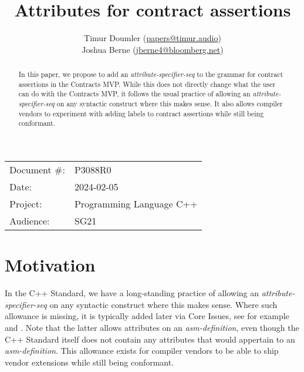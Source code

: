 

 \usepackage[bottom]{footmisc} 


\title{Attributes for contract assertions}
\author{ Timur Doumler \small(\href{mailto:papers@timur.audio}{papers@timur.audio})  \\
Joshua Berne \small(\href{mailto:jberne4@bloomberg.net}{jberne4@bloomberg.net})
}
\date{}
\maketitle

\begin{tabular}{ll}
Document \#: & P3088R0 \\
Date: &2024-02-05 \\
Project: & Programming Language C++ \\
Audience: & SG21
\end{tabular}

\begin{abstract}
In this paper, we propose to add an \emph{attribute-specifier-seq} to the grammar for contract assertions in the Contracts MVP. While this does not directly change what the user can do with the Contracts MVP, it follows the usual practice of allowing an \emph{attribute-specifier-seq} on any syntactic construct where this makes sense. It also allows compiler vendors to experiment with adding labels to contract assertions while still being conformant. 
\end{abstract}

\section{Motivation}
\label{sec:intro}

In the C++ Standard, we have a long-standing practice of allowing an \emph{attribute-specifier-seq} on any syntactic construct where this makes sense. Where such allowance is missing, it is typically added later via Core Issues, see for example \cite{CWG1657} and \cite{CWG2262}. Note that the latter allows attributes on an \emph{asm-definition}, even though the C++ Standard itself does not contain any attributes that would appertain to an \emph{asm-definition}. This allowance exists for compiler vendors to be able to ship vendor extensions while still being conformant.

